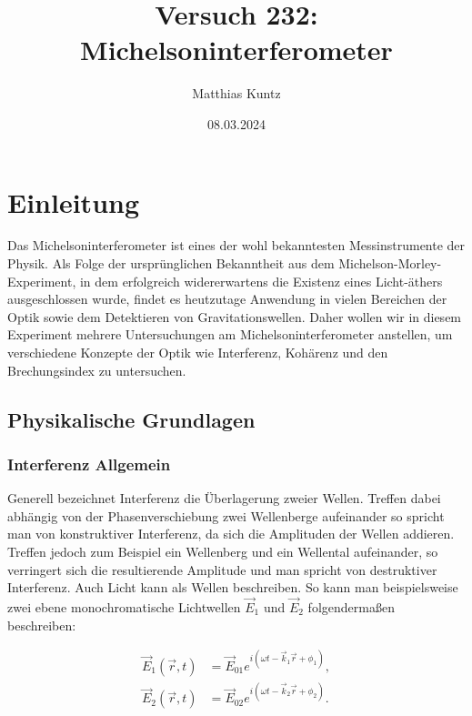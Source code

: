 \documentclass{article}
\title{Versuch 232: Michelsoninterferometer}
\author{Matthias Kuntz}
\date{08.03.2024}
\begin{document}
\maketitle

\tableofcontents

\newpage

\section{Einleitung}

Das Michelsoninterferometer ist eines der wohl bekanntesten Messinstrumente der Physik. Als Folge der ursprünglichen Bekanntheit aus dem Michelson-Morley-Experiment, in dem erfolgreich widererwartens die Existenz eines Licht-äthers ausgeschlossen wurde, findet es heutzutage Anwendung in vielen Bereichen der Optik sowie dem Detektieren von Gravitationswellen. Daher wollen wir in diesem Experiment mehrere Untersuchungen am Michelsoninterferometer anstellen, um verschiedene Konzepte der Optik wie Interferenz, Kohärenz und den Brechungsindex zu untersuchen.

\subsection{Physikalische Grundlagen}

\subsubsection{Interferenz Allgemein}

Generell bezeichnet Interferenz die Überlagerung zweier Wellen. Treffen dabei abhängig von der Phasenverschiebung zwei Wellenberge aufeinander so spricht man von konstruktiver Interferenz, da sich die Amplituden der Wellen addieren. Treffen jedoch zum Beispiel ein Wellenberg und ein Wellental aufeinander, so verringert sich die resultierende Amplitude und man spricht von destruktiver Interferenz. Auch Licht kann als Wellen beschreiben. So kann man beispielsweise zwei ebene monochromatische Lichtwellen $\Vec{E}_1$ und $\Vec{E}_2$ folgendermaßen beschreiben:

\begin{equation}
    \begin{split}
        \Vec{E}_1 (\Vec{r}, t) &= \Vec{E}_{01} e^{i(\omega t - \Vec{k}_1 \Vec{r} + \phi_1)}, \\
        \Vec{E}_2 (\Vec{r}, t) &= \Vec{E}_{02} e^{i(\omega t - \Vec{k}_2 \Vec{r} + \phi_2)}.
    \end{split}
\end{equation}
\end{document}
